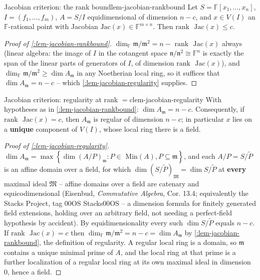 \documentclass[a4paper,11pt]{scrartcl}
\begin{document}
\begin{lemma}{Jacobian criterion: the rank bound}{lem-jacobian-rankbound} Let \(S = \mathbb{F}\left\lbrack x_{1},\ldots,x_{n} \right\rbrack\), \(I = \left( f_{1},\ldots,f_{m} \right)\), \(A = S/I\) equidimensional of dimension \(n - c\), and \(x \in V(I)\) an \(\mathbb{F}\)-rational point with Jacobian \(\text{Jac}(x) \in \mathbb{F}^{m \times n}\). Then \(\text{rank }\text{ Jac}(x) \leq c\).

\end{lemma} \protect{}\label{lem-jacobian-rankbound}{}

\begin{proof}[Proof of \cref{:lem-jacobian-rankbound}] \(\dim_{\mathbb{F}}\mathfrak{m}/\mathfrak{m}^{2} = n - \text{ rank }\text{ Jac}(x)\) always (linear algebra: the image of \(I\) in the cotangent space \(\mathfrak{n}/\mathfrak{n}^{2} \cong \mathbb{F}^{n}\) is exactly the span of the linear parts of generators of \(I\), of dimension \(\text{rank }\text{ Jac}(x)\)), and \(\dim_{\mathbb{F}}\mathfrak{m}/\mathfrak{m}^{2} \geq \dim A_{\mathfrak{m}}\) in any Noetherian local ring, so it suffices that \(\dim A_{\mathfrak{m}} = n - c\) -- which \cref{:lem-jacobian-regularity} supplies.

\end{proof}

\begin{lemma}{Jacobian criterion: regularity at rank \(= c\)}{lem-jacobian-regularity} With hypotheses as in \cref{:lem-jacobian-rankbound}: \(\dim A_{\mathfrak{m}} = n - c\). Consequently, if \(\text{rank }\text{ Jac}(x) = c\), then \(A_{\mathfrak{m}}\) is regular of dimension \(n - c\); in particular \(x\) lies on a \textbf{unique} component of \(V(I)\), whose local ring there is a field.

\end{lemma} \protect{}\label{lem-jacobian-regularity}{}

\begin{proof}[Proof of \cref{:lem-jacobian-regularity}] \(\dim A_{\mathfrak{m}} = \max\left\{ \dim(A/P)_{\mathfrak{m}}:P \in \text{ Min}(A),P \subseteq \mathfrak{m} \right\}\), and each \(A/P = S/\widetilde{P}\) is an affine domain over a field, for which \(\dim\left( S/\widetilde{P} \right)_{\mathfrak{M}} = \dim S/\widetilde{P}\) at \textbf{every} maximal ideal \(\mathfrak{M}\) -- affine domains over a field are catenary and equicodimensional (Eisenbud, \emph{Commutative Algebra}, Cor. 13.4; equivalently the Stacks Project, tag 00OS Stacks00OS -- a dimension formula for finitely generated field extensions, holding over an arbitrary field, not needing a perfect-field hypothesis by accident). By equidimensionality every such \(\dim S/\widetilde{P}\) equals \(n - c\). If \(\text{rank }\text{ Jac}(x) = c\) then \(\dim_{\mathbb{F}}\mathfrak{m}/\mathfrak{m}^{2} = n - c = \dim A_{\mathfrak{m}}\) by \cref{:lem-jacobian-rankbound}, the definition of regularity. A regular local ring is a domain, so \(\mathfrak{m}\) contains a unique minimal prime of \(A\), and the local ring at that prime is a further localization of a regular local ring at its own maximal ideal in dimension 0, hence a field.

\end{proof}
\end{document}
